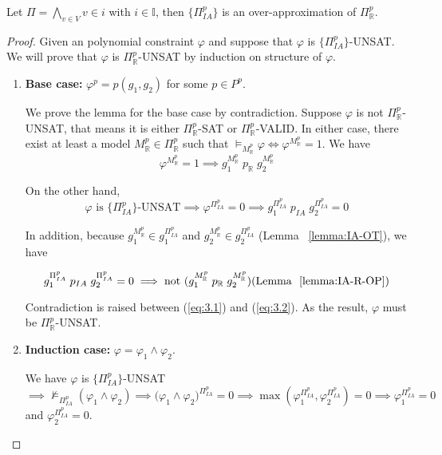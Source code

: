 \begin{theorem} \label{theorem:IA-OverAprox}
Let $\Pi = \bigwedge\limits_{v \in V}v \in i$ with $i \in \mathbb{I}$, then $\{\Pi^p_{IA}\}$ is an over-approximation of $\Pi^p_\mathbb{R}$.
\end{theorem}

\begin{proof}
Given an polynomial constraint $\varphi$ and suppose that $\varphi$ is $\{\Pi^p_{IA}\}$-UNSAT. We will prove that $\varphi$ is $\Pi^p_\mathbb{R}$-UNSAT by induction on structure of $\varphi$.

\begin{enumerate}
\item \textbf{Base case:} \sloppy $\varphi^p = p(g_1, g_2)$ for some $p \in P^p$. 

We prove the lemma for the base case by contradiction. Suppose $\varphi$ is not $\Pi^p_\mathbb{R}$-UNSAT, that means it is either  $\Pi^p_\mathbb{R}$-SAT or  $\Pi^p_\mathbb{R}$-VALID. In either case, there exist at least a model $M^p_\mathbb{R} \in \Pi^p_\mathbb{R}$ such that $\models_{M^p_\mathbb{R}} \varphi \iff \varphi^{M^p_\mathbb{R}}= 1$. We have
\begin{equation} \label{eq:3.1}
\varphi^{M^p_\mathbb{R}}= 1 \implies g_1^{M^p_\mathbb{R}} \; p_\mathbb{R} \; g_2^{M^p_\mathbb{R}}
\end{equation}

On the other hand, \[\varphi\text{ is }\{\Pi^p_{IA}\}\text{-UNSAT} \implies \varphi^{\Pi^p_{IA}} = 0  \implies g_1^{\Pi^p_{IA}} \; p_{IA} \; g_2^{\Pi^p_{IA}} = 0 \] 

In addition, because $g_1^{M^p_\mathbb{R}} \in g_1^{\Pi^p_{IA}}$ and $g_2^{M^p_\mathbb{R}} \in g_2^{\Pi^p_{IA}}$ (Lemma ~\ref{lemma:IA-OT}), we have 

\begin{equation} \label{eq:3.2}
{g_1^{\Pi^p_{IA}} \; p_{IA} \; g_2^{\Pi^p_{IA}} = 0}  \implies \text{not }(g_1^{M^p_\mathbb{R}} \; p_\mathbb{R} \; g_2^{M^p_\mathbb{R}}) \text{(Lemma ~\ref{lemma:IA-R-OP})}
\end{equation}

Contradiction is raised between (\ref{eq:3.1}) and (\ref{eq:3.2}).
As the result, $\varphi$ must be $\Pi^p_\mathbb{R}$-UNSAT.

\item \textbf{Induction case:} $\varphi = \varphi_1 \wedge \varphi_2$.

We have $\varphi$ is  $\{\Pi^p_{IA}\}$-UNSAT $\implies \not\models_{\Pi^p_{IA}}(\varphi_1 \wedge \varphi_2) \implies ({\varphi_1 \wedge \varphi_2)^{\Pi^p_{IA}} = 0}  \implies \max(\varphi_1^{\Pi^p_{IA}}, \varphi_2^{\Pi^p_{IA}}) = 0  \implies \varphi_1^{\Pi^p_{IA}} = 0 $ and ${\varphi_2^{\Pi^p_{IA}} = 0}$. 


\end{enumerate}
\end{proof}
